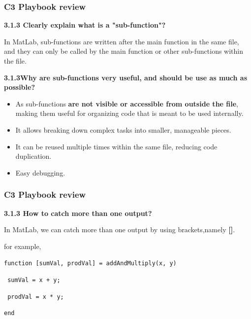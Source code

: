 \documentclass[
	11pt, %
]{beamer}
\begin{document}
\begin{frame}
	\frametitle{C3 Playbook review}
    \textbf{3.1.3 Clearly explain what is a "sub-function"?}

    In MatLab, sub-functions are written after the main function in the same file, and they can only be called by the main function or other sub-functions within the file. 

    \textbf{3.1.3Why are sub-functions very useful, and should be use as much as possible?}
    
    \begin{itemize}
        \item As sub-functions \textbf{are not visible or accessible from outside the file}, making them useful for organizing code that is meant to be used internally.
        \item It allows breaking down complex tasks into smaller, manageable pieces. 
        \item It can be reused multiple times within the same file, reducing code duplication. 
        \item Easy debugging.
    \end{itemize}
\end{frame}
\begin{frame}
	\frametitle{C3 Playbook review}
    \textbf{3.1.3 How to catch more than one output?}

    In MatLab, we can catch more than one output by using brackets,namely \textbf{[]}.
    
    \bigskip

    for example,

    \texttt{function [sumVal, prodVal] = addAndMultiply(x, y)}

    \texttt{ \quad sumVal = x + y;}

    \texttt{ \quad prodVal = x * y;}

    \texttt{end}
\end{frame}
\end{document}
